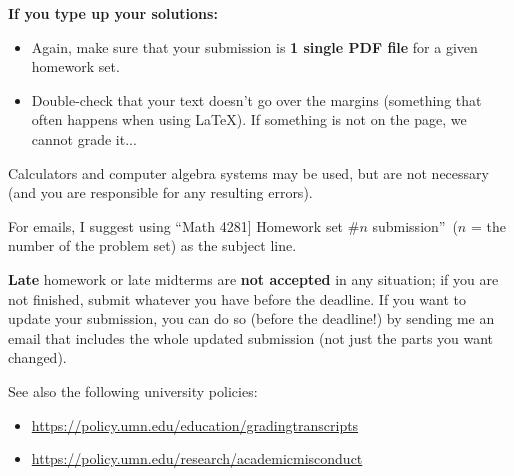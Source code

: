 \documentclass[numbers=enddot,12pt,final,onecolumn,notitlepage]{scrartcl}%
\theoremstyle{definition}
\newenvironment{noncompile}{}{}
\begin{document}
\textbf{If you type up your solutions:}

\begin{itemize}
\item Again, make sure that your submission is \textbf{1 single PDF file} for
a given homework set.

\item Double-check that your text doesn't go over the margins (something that
often happens when using LaTeX). If something is not on the page, we cannot
grade it...
\end{itemize}

Calculators and computer algebra systems may be used, but are not necessary
(and you are responsible for any resulting errors).

\begin{noncompile}
For emails, I suggest using \textquotedblleft\lbrack Math 4281] Homework set
\#$n$ submission\textquotedblright\ ($n$ = the number of the problem set) as
the subject line.
\end{noncompile}

\textbf{Late} homework or late midterms are \textbf{not accepted} in any
situation; if you are not finished, submit whatever you have before the
deadline. If you want to update your submission, you can do so (before the
deadline!) by sending me an email that includes the whole updated submission
(not just the parts you want changed).

See also the following university policies:

\begin{itemize}
\item
\href{https://policy.umn.edu/education/gradingtranscripts}{https://policy.umn.edu/education/gradingtranscripts}%


\item
\href{https://policy.umn.edu/research/academicmisconduct}{https://policy.umn.edu/research/academicmisconduct}%

\end{itemize}
\end{document}
